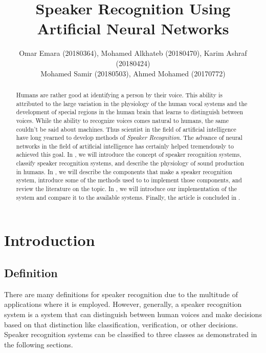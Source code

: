 \documentclass[twocolumn]{article}
\title{Speaker Recognition Using Artificial Neural Networks}
\author{
  Omar Emara (20180364), Mohamed Alkhateb (20180470), Karim Ashraf (20180424) \\
  Mohamed Samir (20180503), Ahmed Mohamed (20170772) \\
}
\begin{document}
\maketitle

\begin{abstract}

  Humans are rather good at identifying a person by their voice. This ability
  is attributed to the large variation in the physiology of the human vocal
  systems and the development of special regions in the human brain that learns
  to distinguish between voices. While the ability to recognize voices comes
  natural to humans, the same couldn't be said about machines. Thus scientist
  in the field of artificial intelligence have long yearned to develop methods
  of \emph{Speaker Recognition}. The advance of neural networks in the field of
  artificial intelligence has certainly helped tremendously to achieved this
  goal. In , we will introduce the concept of speaker
  recognition systems, classify speaker recognition systems, and describe the
  physiology of sound production in humans. In ,
  we will describe the components that make a speaker recognition system,
  introduce some of the methods used to to implement those components, and
  review the literature on the topic. In , we will
  introduce our implementation of the system and compare it to the available
  systems. Finally, the article is concluded in .

\end{abstract}

\section{Introduction}
\label{sec:Introduction}

\subsection{Definition}

There are many definitions for speaker recognition due to the multitude of
applications where it is employed. However, generally, a speaker recognition
system is a system that can distinguish between human voices and make decisions
based on that distinction like classification, verification, or other
decisions. Speaker recognition systems can be classified to three classes as
demonstrated in the following sections.
\end{document}

